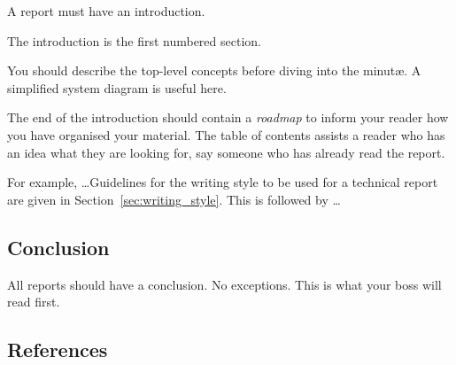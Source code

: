 \documentclass[a4paper,12pt]{article}
\newcommand{\refsec}[1]{\mbox{Section~\ref{sec:#1}}}
\newcounter{foo}
\begin{document}
\begin{list}{I-}{}

\item A report must have an introduction.

\item The introduction is the first numbered section.  

\item You should describe the top-level concepts before diving into
  the minut\ae.  A simplified system diagram is useful here.

\item The end of the introduction should contain a \emph{roadmap} to
inform your reader how you have organised your material.  The table of
contents assists a reader who has an idea what they are looking for,
say someone who has already read the report.

For example, \ldots Guidelines for the writing style to be used for a
technical report are given in \refsec{writing_style}.  This is
followed by \ldots
\end{list}


\subsection{Conclusion}


\begin{list}{C-}{}
\item All reports should have a conclusion.  No exceptions.  This is
what your boss will read first.

\end{list}




\subsection{References}
\label{sec:referencing}
\end{document}
